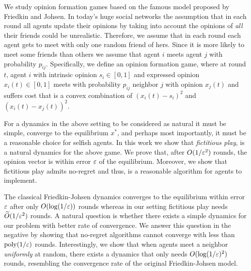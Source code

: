 We study opinion formation games based on the famous model proposed by Friedkin
and Johsen.  In today's huge social networks the assumption that in each round
all agents update their opinions by taking into account the opinions of
\emph{all} their friends could be unrealistic. Therefore, we assume that in
each round each agent gets to meet with only one random friend of
hers.  Since it is more likely to meet some friends than others we assume
that agent $i$ meets agent $j$ with probability $p_{ij}$.
Specifically, we define an opinion formation game, where at round $t$,
agent $i$ with intrinsic opinion $s_i\in[0,1]$ and expressed opinion $x_i(t)
\in[0,1]$ meets with probability $p_{ij}$ neighbor $j$ with opinion $x_j(t)$
and suffers cost that is a convex combination of $(x_i(t) - s_i)^2$ and
$(x_i(t) - x_j(t))^2$.

For a dynamics in the above setting to be considered as natural it must be
simple, converge to the equilibrium $x^*$, and perhaps most importantly, it
must be a reasonable choice for selfish agents.  In this work we show that
\emph{fictitious play}, is a natural dynamics for the above game.  We prove
that, after $O(1/\varepsilon^2)$ rounds, the opinion vector is within error $\varepsilon$  of
the equilibrium. Moreover, we show that fictitious play admits no-regret and
thus, is a reasonable algorithm for agents to implement.

The classical Friedkin-Johsen dynamics converges to the equilibrium within
error $\varepsilon$ after only $O(\log(1/\varepsilon))$ rounds whereas in our setting
fictitious play needs $\widetilde{O}(1/\varepsilon^2)$ rounds. A natural question is
whether there exists a simple dynamics for our problem with better rate of
convergence.  We answer this question in the negative by showing that
no-regret algorithms cannot converge with less than $\mathrm{poly}(1/\varepsilon)$ rounds.
Interestingly, we show that when agents meet a neighbor \emph{uniformly}
at random, there exists a dynamics that only needs $O(\log(1/\varepsilon)^2)$ rounds,
resembling the convergence rate of the original Friedkin-Johsen model.
